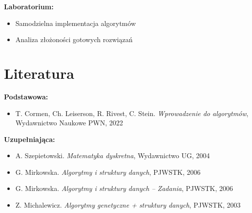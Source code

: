 \documentclass[12pt, a4paper]{article}
\begin{document}
\textbf{Laboratorium:}
\begin{itemize}
  \item Samodzielna implementacja algorytmów
  \item Analiza złożoności gotowych rozwiązań
\end{itemize}

\section{Literatura}

\textbf{Podstawowa:}
\begin{itemize}
  \item T. Cormen, Ch. Leiserson, R. Rivest, C. Stein.
        \emph{Wprowadzenie do algorytmów},
        Wydawnictwo Naukowe PWN, 2022
\end{itemize}

\textbf{Uzupełniająca:}
\begin{itemize}
  \item A. Szepietowski. \emph{Matematyka dyskretna}, Wydawnictwo UG, 2004
  \item G. Mirkowska. \emph{Algorytmy i struktury danych}, PJWSTK, 2006
  \item G. Mirkowska. \emph{Algorytmy i struktury danych -- Zadania}, PJWSTK, 2006
  \item Z. Michalewicz. \emph{Algorytmy genetyczne + struktury danych}, PJWSTK, 2003
\end{itemize}
\end{document}
